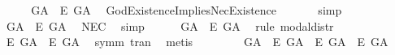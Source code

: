 \begin{isabellebody}
%
%
%
\isamarkupfalse%
\ {\isacharminus}\isanewline
\ \ \isamarkupfalse%
\ {\isachardoublequoteopen}{\isasymlfloor}\isactrlbold {\isasymexists}\ G\isactrlsup A\ \isactrlbold {\isasymrightarrow}\ \isactrlbold {\isasymbox}\isactrlbold {\isasymexists}\isactrlsup E\ G\isactrlsup A{\isasymrfloor}{\isachardoublequoteclose}\ \isamarkupfalse%
\ GodExistenceImpliesNecExistence\ \isanewline
\ \ \ \ \isamarkupfalse%
\ simp\ %
\isanewline
\ \ \isamarkupfalse%
\ {\isachardoublequoteopen}{\isasymlfloor}\isactrlbold {\isasymbox}{\isacharparenleft}\isactrlbold {\isasymexists}\ G\isactrlsup A\ \isactrlbold {\isasymrightarrow}\ \isactrlbold {\isasymbox}\isactrlbold {\isasymexists}\isactrlsup E\ G\isactrlsup A{\isacharparenright}{\isasymrfloor}{\isachardoublequoteclose}\ \isamarkupfalse%
\ NEC\ \isamarkupfalse%
\ simp\isanewline
\ \ \isamarkupfalse%
\ {}{\isacharcolon}\ {\isachardoublequoteopen}{\isasymlfloor}\isactrlbold {\isasymdiamond}\isactrlbold {\isasymexists}\ G\isactrlsup A\ \isactrlbold {\isasymrightarrow}\ \isactrlbold {\isasymdiamond}\isactrlbold {\isasymbox}\isactrlbold {\isasymexists}\isactrlsup E\ G\isactrlsup A{\isasymrfloor}{\isachardoublequoteclose}\ \isamarkupfalse%
\ {\isacharparenleft}rule\ modal{\isacharunderscore}distr{\isacharparenright}\isanewline
\ \ \isamarkupfalse%
\ {}{\isacharcolon}\ {\isachardoublequoteopen}{\isasymlfloor}\isactrlbold {\isasymdiamond}\isactrlbold {\isasymbox}\isactrlbold {\isasymexists}\isactrlsup E\ G\isactrlsup A\ \isactrlbold {\isasymrightarrow}\ \isactrlbold {\isasymbox}\isactrlbold {\isasymexists}\isactrlsup E\ G\isactrlsup A{\isasymrfloor}{\isachardoublequoteclose}\ \isamarkupfalse%
\ symm\ tran\ \isamarkupfalse%
\ metis\isanewline
\ \ \isamarkupfalse%
\ {}\ {}\ \isamarkupfalse%
\ {\isachardoublequoteopen}{\isasymlfloor}\isactrlbold {\isasymdiamond}\isactrlbold {\isasymexists}\ G\isactrlsup A\ \isactrlbold {\isasymrightarrow}\ \isactrlbold {\isasymdiamond}\isactrlbold {\isasymbox}\isactrlbold {\isasymexists}\isactrlsup E\ G\isactrlsup A{\isasymrfloor}\ {\isasymand}\ {\isasymlfloor}\isactrlbold {\isasymdiamond}\isactrlbold {\isasymbox}\isactrlbold {\isasymexists}\isactrlsup E\ G\isactrlsup A\ \isactrlbold {\isasymrightarrow}\ \isactrlbold {\isasymbox}\isactrlbold {\isasymexists}\isactrlsup E\ G\isactrlsup A{\isasymrfloor}{\isachardoublequoteclose}\ \isamarkupfalse%

\end{isabellebody}
